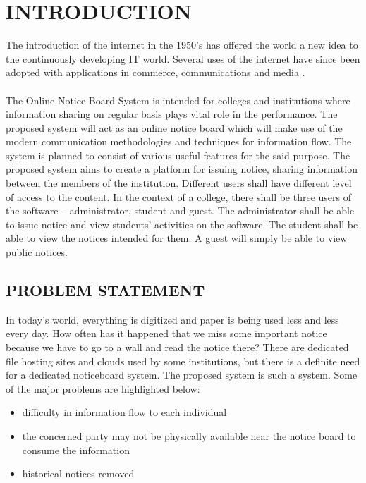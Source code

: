 \documentclass[12pt,a4paper]{article}
\begin{document}
\tableofcontents
\thispagestyle{empty}
\cleardoublepage{}

\listoffigures
{}
\cleardoublepage{}

\newpage
{}
\setcounter{page}{1}
\section{INTRODUCTION}
The introduction of the internet in the 1950’s has offered the world a new idea to the continuously developing IT world. Several uses of the internet
have since been adopted with applications in commerce, communications and media \cite{internet} \cite{internet2}.\\ \\
The Online Notice Board System is intended for colleges and institutions where information sharing on regular basis plays vital role in the performance. The proposed system will act as an online notice board which will make use of the modern communication methodologies and techniques for information flow. The system is planned to consist of various useful features for the said purpose. The proposed system aims to create a platform for issuing notice, sharing information between the members of the institution. Different users shall have different level of access to the content. In the context of a college, there shall be three users of
the software – administrator, student and guest. The administrator shall be
able to issue notice and view students’ activities on the software. The student shall be able to view the notices intended for them. A guest will simply be able to view public notices.\\

	\subsection{PROBLEM STATEMENT}
	In today’s world, everything is digitized and paper is being used less and less every day. How often has it happened that we miss some important notice because we have to go to a wall and read the notice there? There are dedicated file hosting sites and clouds used by some institutions, but there is a definite need for a dedicated noticeboard system. The proposed system is such a system. Some of the major problems are highlighted below:
	\begin{itemize}
	    \item difficulty in information flow to each individual
	    \item the concerned party may not be physically available near the notice board to consume the information
	    \item historical notices removed\\
	\end{itemize}
	
\end{document}
